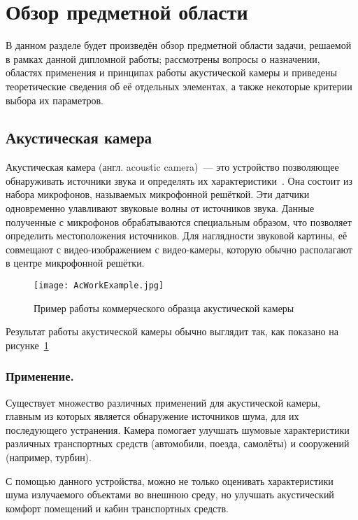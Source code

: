 \section{Обзор предметной области}
\label{section:Theory}
В данном разделе будет произведён обзор предметной области задачи, решаемой в рамках данной дипломной работы; рассмотрены вопросы о назначении, областях применения и принципах работы акустической камеры и приведены теоретические сведения об её отдельных элементах, а также некоторые критерии выбора их параметров. 

\subsection{Акустическая камера}
Акустическая камера (англ. \foreignlanguage{english}{acoustic camera})~--- это устройство позволяющее обнаруживать источники звука и определять их характеристики~\cite{Wiki_AcousticCamera}. Она состоит из набора микрофонов, называемых микрофонной решёткой. Эти датчики одновременно улавливают звуковые волны от источников звука. Данные полученные с микрофонов обрабатываются специальным образом, что позволяет определить местоположения источников. Для наглядности звуковой картины, её совмещают с видео-изображением с видео-камеры, которую обычно располагают в центре микрофонной решётки.

\begin{figure}[ht]
	\centering
	\texttt{[image: AcWorkExample.jpg]}  
	\caption{Пример работы коммерческого образца акустической камеры}
	\label{fig:AcWorkExample}
\end{figure}

Результат работы акустической камеры обычно выглядит так, как показано на рисунке~\ref{fig:AcWorkExample}

\subsubsection{Применение. }
Существует множество различных применений для акустической камеры, главным из которых является обнаружение источников шума, для их последующего устранения. Камера помогает улучшать шумовые характеристики различных транспортных средств (автомобили, поезда, самолёты) и сооружений (например, турбин). 

С помощью данного устройства, можно не только оценивать характеристики шума излучаемого объектами во внешнюю среду, но улучшать акустический комфорт помещений и кабин транспортных средств.

